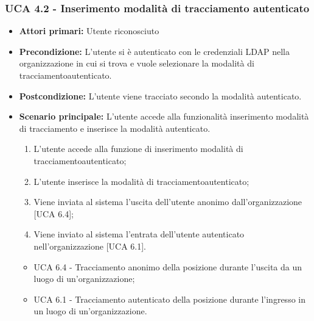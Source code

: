 \subsubsection{UCA 4.2 - Inserimento modalità di tracciamento autenticato}%
\begin{itemize}
	\item \textbf{Attori primari:} Utente riconosciuto
	\item \textbf{Precondizione:} L'utente si è autenticato con le credenziali LDAP nella organizzazione in cui si trova e vuole selezionare la modalità di tracciamentoautenticato.
	\item \textbf{Postcondizione:} L'utente viene tracciato secondo la modalità autenticato.
	\item \textbf{Scenario principale:} L'utente accede alla funzionalità inserimento modalità di tracciamento e inserisce la modalità autenticato.
	\begin{enumerate}
		\item L'utente accede alla funzione di inserimento modalità di tracciamentoautenticato;
		\item L'utente inserisce la modalità di tracciamentoautenticato;
		\item Viene inviata al sistema l'uscita dell'utente anonimo dall'organizzazione [UCA 6.4];
		\item Viene inviato al sistema l'entrata dell'utente autenticato nell'organizzazione [UCA 6.1].
	\end{enumerate}
	\begin{itemize}
		\item UCA 6.4 - Tracciamento anonimo della posizione durante l'uscita da un luogo di un'organizzazione;
		\item UCA 6.1 - Tracciamento autenticato della posizione durante l'ingresso in un luogo di un'organizzazione.
	\end{itemize}
\end{itemize}
